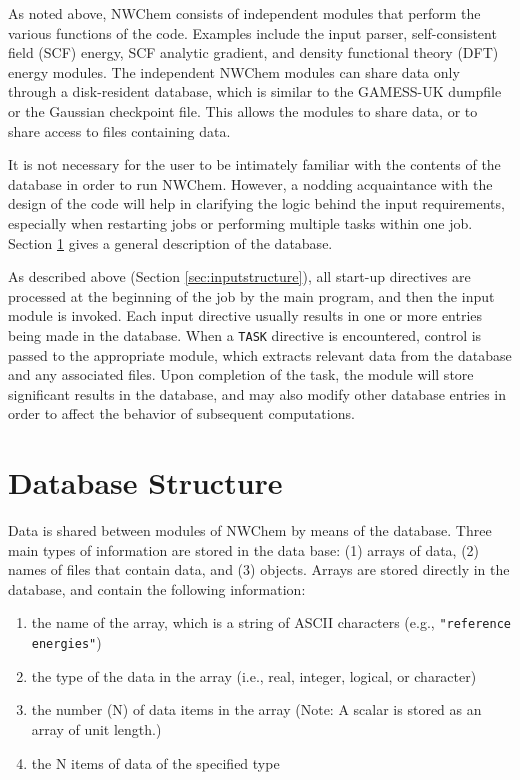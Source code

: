 \label{sec:arch}

As noted above, NWChem consists of independent modules that perform
the various functions of the code.  Examples include the input parser,
self-consistent field (SCF) energy, SCF analytic gradient, and density
functional theory (DFT) energy modules.  The independent NWChem
modules can share data only through a disk-resident database, which is
similar to the GAMESS-UK dumpfile or the Gaussian checkpoint file.
This allows the modules to share data, or to share
access to files containing data.

It is not necessary for the user to be intimately familiar with the
contents of the database in order to run NWChem.  However, a nodding
acquaintance with the design of the code will help in clarifying the
logic behind the input requirements, especially when restarting jobs
or performing multiple tasks within one job.  Section
\ref{sec:database} gives a general description of the database.

As described above (Section \ref{sec:inputstructure}), all start-up
directives are processed at the beginning of the job by the main
program, and then the input module is invoked.  Each input directive
usually results in one or more entries being made in the database.
When a \verb+TASK+ directive is encountered, control is passed to the
appropriate module, which extracts relevant data from the database and
any associated files.  Upon completion of the task, the module will
store significant results in the database, and may also modify other
database entries in order to affect the behavior of subsequent
computations.

\section{Database Structure}
\label{sec:database}

\sloppy

Data is shared between modules of NWChem by means of the database.
Three main types of information are stored in the data base: (1)
arrays of data, (2) names of files that contain data, and (3) objects.
Arrays are stored directly in the database, and contain the following
information:
\begin{enumerate}
\item the name of the array, which is a string of ASCII characters
  (e.g., \verb+"reference energies"+)
\item the type of the data in the array (i.e., real, integer, logical,
  or character)
\item the number (N) of data items in the array (Note: A scalar is
  stored as an array of unit length.)
\item the N items of data of the specified type
\end{enumerate}

